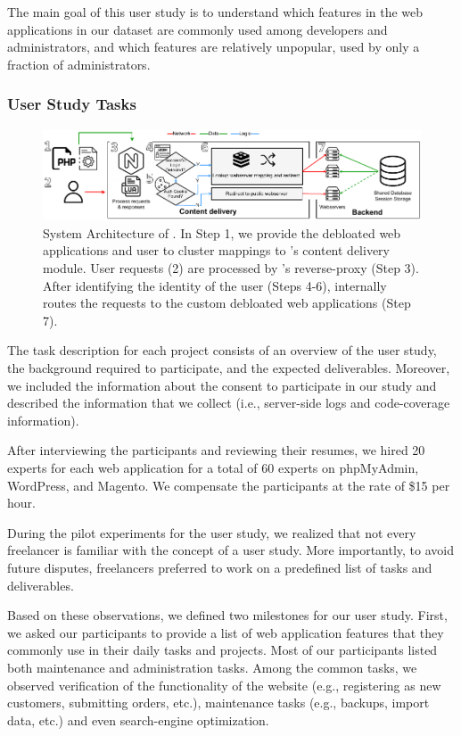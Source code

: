The main goal of this user study is to understand which features in the web applications in our dataset are commonly used among developers and administrators, and which features are relatively unpopular, used by only a fraction of administrators.

\subsubsection{User Study Tasks}

\begin{figure}[h]
    \centering
    \includegraphics[width=0.95\columnwidth]{figures/dbltr/RoleModelsFlow.pdf}
    \caption{System Architecture of \sys{}. In Step 1, we provide the debloated web applications and user to cluster mappings to \sys{}'s content delivery module. User requests (2) are processed by \sys{}'s reverse-proxy (Step 3). After identifying the identity of the user (Steps 4-6), \sys{} internally routes the requests to the custom debloated web applications (Step 7).}
	\label{fig:system_architecture}
\end{figure}

The task description for each project consists of an overview of the user study, the background required to participate, and the expected deliverables. 
Moreover, we included the information about the consent to participate in our study and described the information that we collect (i.e., server-side logs and code-coverage information). 

After interviewing the participants and reviewing their resumes, we hired 20 experts for each web application for a total of 60 experts on phpMyAdmin, WordPress, and Magento. 
We compensate the participants at the rate of \$15 per hour.

During the pilot experiments for the user study, we realized that not every freelancer is familiar with the concept of a user study. 
More importantly, to avoid future disputes, freelancers preferred to work on a predefined list of tasks and deliverables. 

Based on these observations, we defined two milestones for our user study. 
First, we asked our participants to provide a list of web application features that they commonly use in their daily tasks and projects. 
Most of our participants listed both maintenance and administration tasks. 
Among the common tasks, we observed verification of the functionality of the website (e.g., registering as new customers, submitting orders, etc.), maintenance tasks (e.g., backups, import data, etc.) and even search-engine optimization. 

